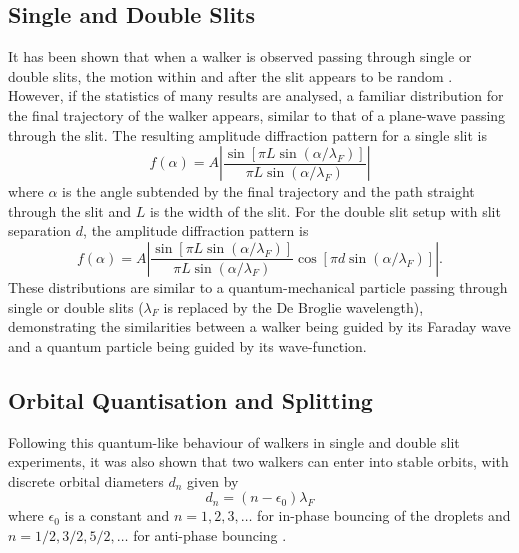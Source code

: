 \documentclass[11pt,twocolumn]{article}
\begin{document}
\subsection{Single and Double Slits} 
\label{sec:singleandcoubleslits}
It has been shown that when a walker is observed passing through single or double slits, the motion within and after the slit appears to be random \cite{1}.  However, if the statistics of many results are analysed, a familiar distribution for the final trajectory of the walker appears, similar to that of a plane-wave passing through the slit.  The resulting amplitude diffraction pattern for a single slit is
\begin{equation}
    \label{singleslitamplitude}
    f(\alpha)=A\left|\frac{\sin[\pi L\sin(\alpha/\lambda_F)]}{\pi L\sin(\alpha/\lambda_F)}\right|
\end{equation}
where $\alpha$ is the angle subtended by the final trajectory and the path straight through the slit and $L$ is the width of the slit.  For the double slit setup with slit separation $d$, the amplitude diffraction pattern is
\begin{equation}
    \label{doubleslitamplitude}
    f(\alpha)=A\left|\frac{\sin\left[\pi L\sin(\alpha/\lambda_F)\right]}{\pi L\sin(\alpha/\lambda_F)}\cos\left[\pi d\sin(\alpha/\lambda_F)\right]\right|.
\end{equation}
These distributions are similar to a quantum-mechanical particle passing through single or double slits ($\lambda_F$ is replaced by the De Broglie wavelength), demonstrating the similarities between a walker being guided by its Faraday wave and a quantum particle being guided by its wave-function.

\subsection{Orbital Quantisation and Splitting}
\label{sec:orbitalquantisationandsplitting}
Following this quantum-like behaviour of walkers in single and double slit experiments, it was also shown that two walkers can enter into stable orbits, with discrete orbital diameters $d_n$ given by
\begin{equation}
    \label{orbit}
    d_n=(n-\epsilon_0)\lambda_F
\end{equation}
where $\epsilon_0$ is a constant and $n=1,2,3,\ldots$ for in-phase bouncing of the droplets and $n=1/2,3/2,5/2,\ldots$ for anti-phase bouncing \cite{5,9,6}.
\end{document}
